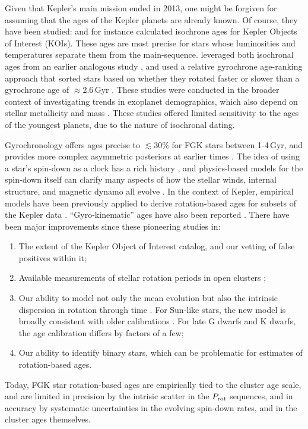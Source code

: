 \documentclass[11pt,twocolumn,tighten]{aastex63}
\begin{document}
Given that Kepler's main mission ended in 2013, one might be
forgiven for assuming that the ages of the Kepler planets are already
known.  Of course, they have been studied: \citet{Berger_2020b_rpage}
and \citet{Petigura_2022} for instance calculated isochrone ages for
Kepler Objects of Interest (KOIs).  These ages are most precise for
stars whose luminosities and temperatures separate them from the
main-sequence.  \citet{David_2021} leveraged both isochronal ages from
an earlier analogous study \citep{Fulton_2018}, and
used a relative gyrochrone age-ranking approach that sorted stars
based on whether they rotated faster or slower than a gyrochrone age
of $\approx$2.6\,Gyr \citep{Meibom_2015,Curtis_2020}.  These studies
were conducted in the broader context of investigating trends in
exoplanet demographics, which also depend on stellar metallicity and
mass \citep[e.g.][]{Petigura_2018}.  These studies offered limited
sensitivity to the ages of the youngest planets, due to the nature of
isochronal dating.

Gyrochronology offers ages precise to $\lesssim$30\% for FGK stars
between 1-4\,Gyr, and provides more complex asymmetric posteriors at earlier
times \citep{Bouma_2023}.  The idea of using a star's spin-down as a
clock has a rich history
\citep{Skumanich_1972,Noyes_1984,Kawaler_1989,Barnes03,Mamajek_2008,Angus_2015},
and physics-based models for the spin-down itself can clarify many
aspects of how the stellar winds, internal structure, and magnetic
dynamo all evolve
\citep[e.g.][]{Matt_2015,Gallet_Bouvier_2015,Spada_2020}.  In the
context of Kepler, empirical models have been previously applied to
derive rotation-based ages for subsets of the Kepler data
\citep{Walkowicz_2013,Reinhold_2015,Angus_2018}.  ``Gyro-kinematic'' ages
have also been reported \citep{2021AJ....161..189L}.
There have been
major improvements since these pioneering studies in:
\begin{enumerate}[label={\it \roman*)},leftmargin=*,topsep=0pt,itemsep=-1ex,partopsep=1ex,parsep=1ex]
  \item The extent of the Kepler Object of Interest catalog, and our vetting of false
    positives within it;
  \item Available measurements of stellar rotation periods
    in open clusters
    \citep[e.g.][]{Curtis_2019_ngc6811,Gillen_2020,Rampalli_2021,Fritzewski_2021,Rebull_2022,Dungee_2022,2023AJ....166...14B};
  \item Our ability to model not only the mean evolution but also the
    intrinsic dispersion in rotation through time
    \citep{Bouma_2023}.  For Sun-like stars, the new model is broadly
    consistent with older calibrations \citep[e.g.][]{Mamajek_2008}.
    For late G dwarfs and K dwarfs, the age calibration
    differs by factors of a few;
  \item Our ability to identify binary stars, which can be problematic
    for estimates of rotation-based ages.
\end{enumerate}
Today, FGK star rotation-based ages are
empirically tied to the cluster age scale, and
are limited in precision by the intrisic scatter in the $P_{\rm rot}$
sequences, and in accuracy by systematic uncertainties in the evolving
spin-down rates, and in the cluster ages themselves.  
\end{document}
